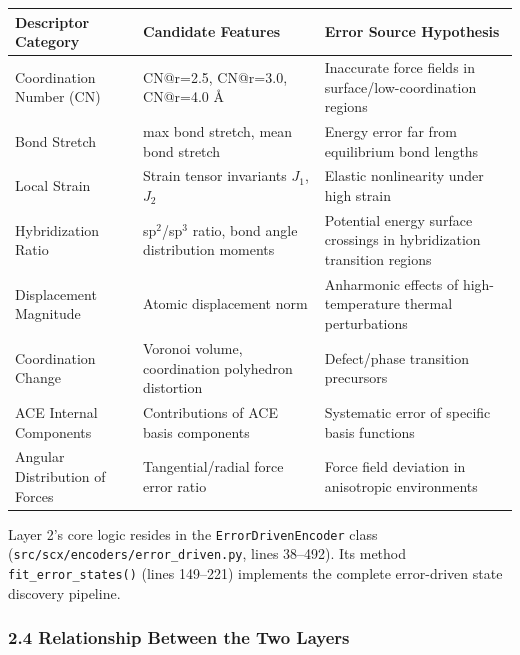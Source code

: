 \documentclass[
  12pt,
]{article}
\begin{document}
\begin{longtable}[]{@{}
  >{\raggedright\arraybackslash}p{}
  >{\raggedright\arraybackslash}p{}
  >{\raggedright\arraybackslash}p{}@{}}
\toprule\noalign{}
\begin{minipage}[b]{\linewidth}\raggedright
Descriptor Category
\end{minipage} & \begin{minipage}[b]{\linewidth}\raggedright
Candidate Features
\end{minipage} & \begin{minipage}[b]{\linewidth}\raggedright
Error Source Hypothesis
\end{minipage} \\
\midrule\noalign{}
\endhead
\bottomrule\noalign{}
\endlastfoot
Coordination Number (CN) & CN@r=2.5, CN@r=3.0, CN@r=4.0 Å & Inaccurate force fields in surface/low-coordination regions \\
Bond Stretch & max bond stretch, mean bond stretch & Energy error far from equilibrium bond lengths \\
Local Strain & Strain tensor invariants $J_1$, $J_2$ & Elastic nonlinearity under high strain \\
Hybridization Ratio & sp$^2$/sp$^3$ ratio, bond angle distribution moments & Potential energy surface crossings in hybridization transition regions \\
Displacement Magnitude & Atomic displacement norm & Anharmonic effects of high-temperature thermal perturbations \\
Coordination Change & Voronoi volume, coordination polyhedron distortion & Defect/phase transition precursors \\
ACE Internal Components & Contributions of ACE basis components & Systematic error of specific basis functions \\
Angular Distribution of Forces & Tangential/radial force error ratio & Force field deviation in anisotropic environments \\
\end{longtable}

Layer 2's core logic resides in the \texttt{ErrorDrivenEncoder} class (\texttt{src/scx/encoders/error\_driven.py}, lines 38--492). Its method \texttt{fit\_error\_states()} (lines 149--221) implements the complete error-driven state discovery pipeline.

\subsubsection{2.4 Relationship Between the Two Layers}\label{relationship-between-two-layers}
\end{document}
